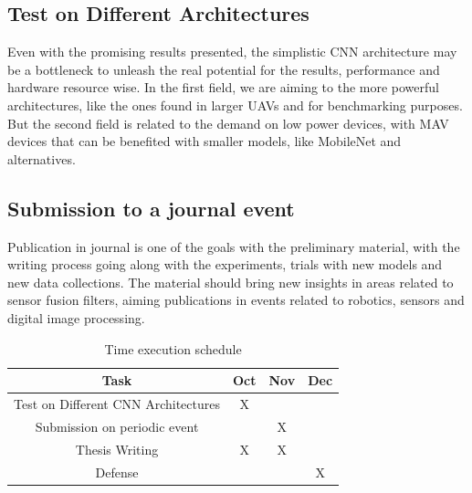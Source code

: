     \subsection{Test on Different Architectures}
        Even with the promising results presented, the simplistic CNN architecture may be a bottleneck to unleash the real potential for the results, performance and hardware resource wise. 
        In the first field, we are aiming to the more powerful architectures, like the ones found in larger UAVs and for benchmarking purposes. 
        But the second field is related to the demand on low power devices, with MAV devices that can be benefited with smaller models, like MobileNet and alternatives. 

    
    \subsection{Submission to a journal event}
        Publication in journal is one of the goals with the preliminary material, with the writing process going along with the experiments, trials with new models and new data collections.
        The material should bring new insights in areas related to sensor fusion filters, aiming publications in events related to robotics, sensors and digital image processing.
    
    \begin{table}[htbp]
    \caption{Time execution schedule}
        \begin{center}
            \begin{tabular}{|c|c|c|c|}
            \hline
            \textbf{Task} & \textbf{Oct} & \textbf{Nov} & \textbf{Dec} \\
            \hline
            Test on Different CNN Architectures & X &  & \\
            \hline
            Submission on periodic event & & X &\\
            \hline
            Thesis Writing & X & X & \\
            \hline
            Defense & & & X \\
            \hline
            \end{tabular}
        \label{tabela_sumario}
        \end{center}
    \end{table}
